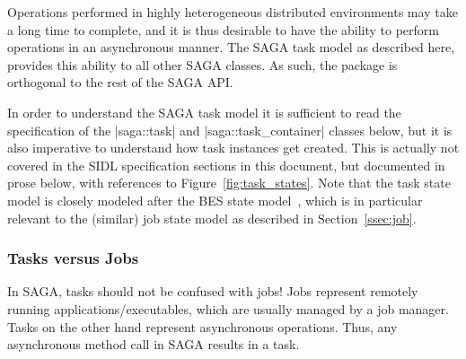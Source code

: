   
  Operations performed in highly heterogeneous distributed
  environments may take a long time to complete, and it is thus
  desirable to have the ability to perform operations in an
  asynchronous manner.  The SAGA task model as described here,
  provides this ability to all other SAGA classes.  As such, the
  package is orthogonal to the rest of the SAGA API.
  
  
  
  In order to understand the SAGA task model it is 
  sufficient to read the specification of the |saga::task| and
  |saga::task_container| classes below, but it is also
  imperative to understand how task instances get created.  This
  is actually not covered in the SIDL specification sections in
  this document, but documented in prose below, with references
  to Figure~\ref{fig:task_states}.  Note that the task state
  model is closely modeled after the BES state model~\cite{bes},
  which is in particular relevant to the (similar) job state
  model as described in Section~\ref{ssec:job}.
 
  \subsubsection*{Tasks versus Jobs}
 
   In SAGA, tasks should not be confused with jobs!
   Jobs represent remotely running applications/executables,
   which are usually managed by a job manager.  Tasks on the
   other hand represent asynchronous operations.  Thus, any
   asynchronous method call in SAGA results in a task.
  
